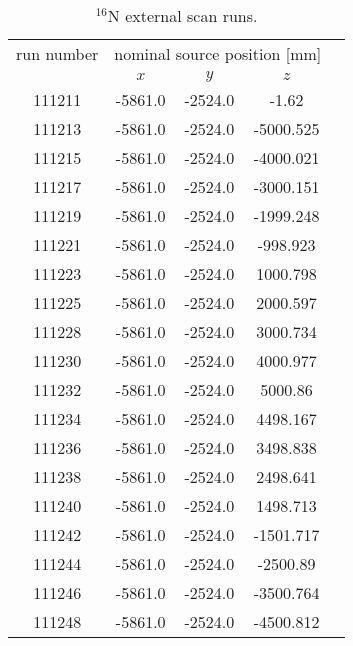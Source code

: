 \begin{table}[ht]
		\caption[$^{16}$N external scan runs.]{$^{16}$N external scan runs.	\label{table:n16scanTable_external}}
						\vspace{2mm}
				\centering
	\begin{tabular*}{90mm}{c@{\extracolsep{\fill}}*4c}
		\toprule 
		run number  & \multicolumn{3}{c}{nominal source position [mm]}  \\
		\cline{2-4}
		& $x$ & $y$ & $z$\\   
		\midrule
		111211  & -5861.0 & -2524.0 & -1.62\\
		111213  & -5861.0 & -2524.0 & -5000.525\\
		111215  & -5861.0 & -2524.0 & -4000.021\\
		111217  & -5861.0 & -2524.0 & -3000.151\\
		111219  & -5861.0 & -2524.0 & -1999.248\\
		111221  & -5861.0 & -2524.0 & -998.923\\
		111223  & -5861.0 & -2524.0 & 1000.798\\
		111225  & -5861.0 & -2524.0 & 2000.597\\
		111228  & -5861.0 & -2524.0 & 3000.734\\
		111230  & -5861.0 & -2524.0 & 4000.977\\
		111232  & -5861.0 & -2524.0 & 5000.86\\
		111234  & -5861.0 & -2524.0 & 4498.167\\
		111236  & -5861.0 & -2524.0 & 3498.838\\
		111238  & -5861.0 & -2524.0 & 2498.641\\
		111240  & -5861.0 & -2524.0 & 1498.713\\
		111242  & -5861.0 & -2524.0 & -1501.717\\
		111244  & -5861.0 & -2524.0 & -2500.89\\
		111246  & -5861.0 & -2524.0 & -3500.764\\
		111248  & -5861.0 & -2524.0 & -4500.812\\
		\bottomrule	
	\end{tabular*}
\end{table}
